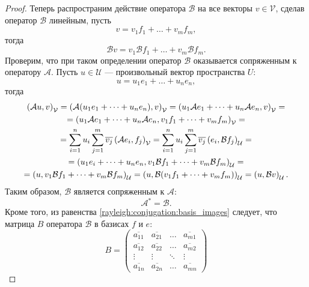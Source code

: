 \begin{proof}
    Теперь распространим действие оператора $\mathcal{B}$ на все векторы $v \in \mathcal{V}$, сделав оператор $\mathcal{B}$ линейным, пусть
    \[
        v = v_1 f_1 + \dots + v_m f_m,
    \]
    тогда
    \[
        \mathcal{B} v = v_1 \mathcal{B} f_1 + \dots + v_m \mathcal{B} f_m .
    \]
    Проверим, что при таком определении оператор $\mathcal{B}$ оказывается сопряженным к оператору $\mathcal{A}$. Пусть $u \in \mathcal{U}$ --- произвольный вектор
    пространства $U$:
    \[
        u = u_1 e_1 + \dots + u_n e_n,
    \]
    тогда
    \begin{multline*}
        \left ( \mathcal{A} u, v \right )_\mathcal{V}
        = \left ( \mathcal{A} (u_1 e_1 + \dots + u_n e_n), v \right )_\mathcal{V}
        = \left ( u_1 \mathcal{A} e_1 + \dots + u_n \mathcal{A} e_n, v \right )_\mathcal{V} = \\
        = \left ( u_1 \mathcal{A} e_1 + \dots + u_n \mathcal{A} e_n, v_1 f_1 + \dots + v_m f_m \right )_\mathcal{V} = \\
        = \sum_{i=1}^n u_i \sum_{j=1}^m \overline{v_j} \left ( \mathcal{A} e_i, f_j \right )_\mathcal{V}
        = \sum_{i=1}^n u_i \sum_{j=1}^m \overline{v_j} \left ( e_i, \mathcal{B} f_j \right )_\mathcal{U} = \\
        = \left ( u_1 e_i + \dots + u_n e_n, v_1 \mathcal{B} f_1 + \dots + v_m \mathcal{B} f_m \right )_\mathcal{U} = \\
        = \left ( u, v_1 \mathcal{B} f_1 + \dots + v_m \mathcal{B} f_m \right )_\mathcal{U}
        = \left ( u, \mathcal{B} (v_1 f_1 + \dots + v_m f_m) \right )_\mathcal{U}
        = \left ( u, \mathcal{B} v \right )_\mathcal{U} .
    \end{multline*}
    Таким образом, $\mathcal{B}$ является сопряженным к $\mathcal{A}$:
    \[
        \mathcal{A}^* = \mathcal{B}.
    \]
    Кроме того, из равенства \eqref{rayleigh:conjugation:basis_images} следует, что матрица $B$ оператора $\mathcal{B}$ в базисах $f$ и $e$:
    \[
        B =
        \begin{pmatrix}
            \overline{a_{11}} & \overline{a_{21}} & \dots  & \overline{a_{m1}} \\
            \overline{a_{12}} & \overline{a_{22}} & \dots  & \overline{a_{m2}} \\
            \vdots            & \vdots            & \ddots & \vdots            \\
            \overline{a_{1n}} & \overline{a_{2n}} & \dots  & \overline{a_{mn}}
        \end{pmatrix}
\]
\end{proof}
